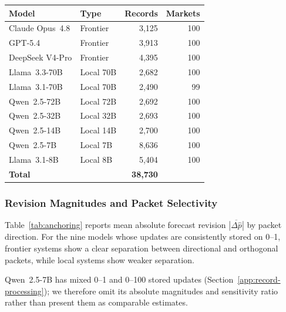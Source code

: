 \begin{center}
\begin{minipage}{\linewidth}
\centering
{}
\label{tab:model-summary}
\small
\begin{tabular}{llrr}
\toprule
\textbf{Model} & \textbf{Type} & \textbf{Records} & \textbf{Markets} \\
\midrule
Claude Opus~4.8 & Frontier  & 3{,}125 & 100 \\
GPT-5.4         & Frontier  & 3{,}913 & 100 \\
DeepSeek V4-Pro & Frontier  & 4{,}395 & 100 \\
Llama~3.3-70B   & Local 70B & 2{,}682 & 100 \\
Llama~3.1-70B   & Local 70B & 2{,}490 &  99 \\
Qwen~2.5-72B    & Local 72B & 2{,}692 & 100 \\
Qwen~2.5-32B    & Local 32B & 2{,}693 & 100 \\
Qwen~2.5-14B    & Local 14B & 2{,}700 & 100 \\
Qwen~2.5-7B     & Local 7B  & 8{,}636 & 100 \\
Llama~3.1-8B    & Local 8B  & 5{,}404 & 100 \\
\midrule
\textbf{Total}  &           & \textbf{38{,}730} & \\
\bottomrule
\end{tabular}
\end{minipage}
\end{center}

\subsubsection{Revision Magnitudes and Packet Selectivity}
Table~\ref{tab:anchoring} reports mean absolute forecast revision
\(\overline{|\Delta\hat p|}\) by packet direction.  For the nine models whose updates
are consistently stored on 0--1, frontier systems show a clear separation between
directional and orthogonal packets, while local systems show weaker separation.

Qwen~2.5-7B has mixed 0--1 and 0--100 stored updates
(Section~\ref{app:record-processing}); we therefore omit its absolute magnitudes
and sensitivity ratio rather than present them as comparable estimates.

